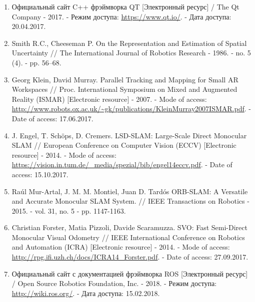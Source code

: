 \begin{enumerate}
    \item \label{itm:qt} Официальный сайт C++ фрэймворка QT [Электронный ресурс] / The Qt Company - 2017. - Режим доступа: \url{https://www.qt.io/}. - Дата доступа: 20.04.2017.
    
    \item \label{itm:cheeseman} Smith R.C., Cheeseman P. On the Representation and Estimation of Spatial Uncertainty // The International Journal of Robotics Research - 1986. - no. 5 (4). - pp. 56–68.
    
    \item \label{itm:ptam} Georg Klein, David Murray. Parallel Tracking and Mapping for Small AR Workspaces // Proc. International Symposium on Mixed and Augmented Reality (ISMAR) [Electronic resource] - 2007. - Mode of access: \url{http://www.robots.ox.ac.uk/~gk/publications/KleinMurray2007ISMAR.pdf}. - Date of access: 17.06.2017.
    
    \item \label{itm:lsd} J. Engel, T. Schöps, D. Cremers. LSD-SLAM: Large-Scale Direct Monocular SLAM // European Conference on Computer Vision (ECCV) [Electronic resource] - 2014. - Mode of access: \url{https://vision.in.tum.de/_media/spezial/bib/engel14eccv.pdf}. - Date of access: 15.10.2017.
    
    \item \label{itm:orbslam} Raúl Mur-Artal, J. M. M. Montiel, Juan D. Tardós ORB-SLAM: A Versatile and Accurate Monocular SLAM System. // IEEE Transactions on Robotics - 2015. - vol. 31, no. 5 - pp. 1147-1163.
    
    \item \label{itm:svo} Christian Forster, Matia Pizzoli, Davide Scaramuzza. SVO: Fast Semi-Direct Monocular Visual Odometry // IEEE International Conference on Robotics and Automation (ICRA) [Electronic resource] - 2014. - Mode of access: \url{http://rpg.ifi.uzh.ch/docs/ICRA14_Forster.pdf}. - Date of access: 27.09.2017.
    
    \item \label{itm:last}\label{itm:ros} Официальный сайт с документацией фрэймворка ROS [Электронный ресурс] /  Open Source Robotics Foundation, Inc. - 2018. - Режим доступа: \url{http://wiki.ros.org/}. - Дата доступа: 15.02.2018.
\end{enumerate}

\newpage
